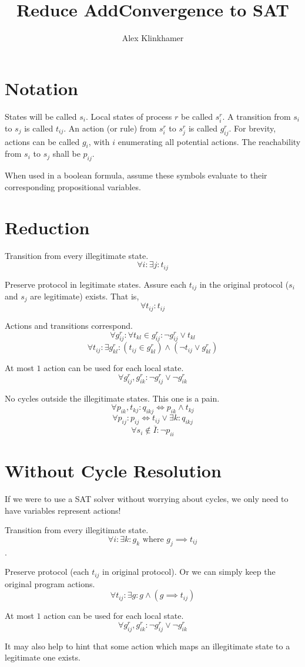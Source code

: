



\title{Reduce AddConvergence to SAT}
\author{Alex Klinkhamer}
\maketitle

\section{Notation}
States will be called $s_i$.
Local states of process $r$ be called $s_i^r$.
A transition from $s_i$ to $s_j$ is called $t_{ij}$.
An action (or rule) from $s_i^r$ to $s_j^r$ is called $g_{ij}^r$.
For brevity, actions can be called $g_i$, with $i$ enumerating all potential actions.
The reachability from $s_i$ to $s_j$ shall be $p_{ij}$.

When used in a boolean formula, assume these symbols evaluate to their corresponding propositional variables.

\section{Reduction}
Transition from every illegitimate state.
$$\forall i:\exists j: t_{ij}$$

Preserve protocol in legitimate states.
Assure each $t_{ij}$ in the original protocol ($s_i$ and $s_j$ are legitimate) exists. That is, $$\forall t_{ij}: t_{ij}$$

Actions and transitions correspond.
$$\forall g_{ij}^r:\forall t_{kl}\in g_{ij}^r: \neg g_{ij}^r \vee t_{kl}$$
$$\forall t_{ij}:\exists g_{kl}^r: \left(t_{ij}\in g_{kl}^r\right) \wedge\left(\neg t_{ij}\vee g_{kl}^r\right)$$

At most $1$ action can be used for each local state.
$$\forall g_{ij}^r, g_{ik}^r: \neg g_{ij}^r \vee \neg g_{ik}^r$$

No cycles outside the illegitimate states.
This one is a pain.
$$\forall p_{ik},t_{kj}: q_{ikj}\iff p_{ik} \wedge t_{kj}$$
$$\forall p_{ij}: p_{ij}\iff t_{ij}\vee\exists k: q_{ikj}$$
$$\forall s_i\notin \overline{I}: \neg p_{ii}$$

\section{Without Cycle Resolution}
If we were to use a SAT solver without worrying about cycles, we only need to have variables represent actions!

Transition from every illegitimate state.
$$\forall i:\exists k: g_k \mbox{ where } g_j\implies t_{ij}$$.

Preserve protocol (each $t_{ij}$ in original protocol).
Or we can simply keep the original program actions.
$$\forall t_{ij}: \exists g: g\wedge (g\implies t_{ij})$$

At most $1$ action can be used for each local state.
$$\forall g_{ij}^r, g_{ik}^r: \neg g_{ij}^r \vee \neg g_{ik}^r$$

It may also help to hint that some action which maps an illegitimate state to a legitimate one exists.


